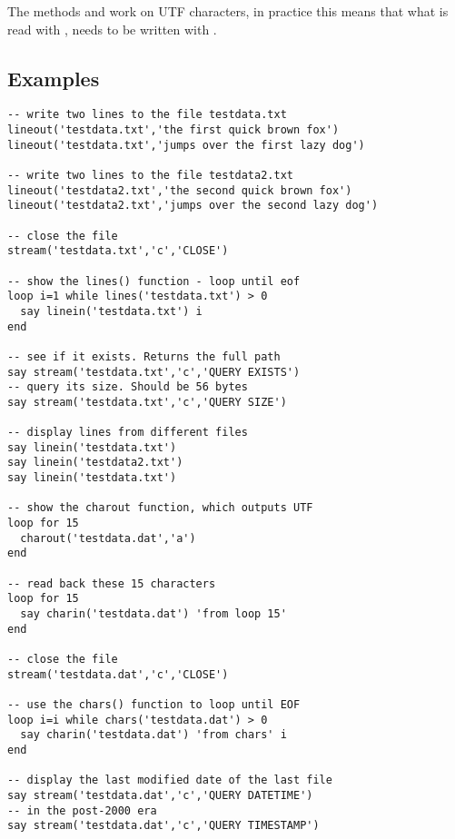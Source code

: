 The methods  and  work on UTF
characters, in practice this means that what is read with
, needs to be written with .


\subsection{Examples}
\begin{lstlisting}[label=datessexample,caption=Example of using Date()]
-- write two lines to the file testdata.txt
lineout('testdata.txt','the first quick brown fox')
lineout('testdata.txt','jumps over the first lazy dog')

-- write two lines to the file testdata2.txt
lineout('testdata2.txt','the second quick brown fox')
lineout('testdata2.txt','jumps over the second lazy dog')

-- close the file
stream('testdata.txt','c','CLOSE')

-- show the lines() function - loop until eof
loop i=1 while lines('testdata.txt') > 0
  say linein('testdata.txt') i
end

-- see if it exists. Returns the full path
say stream('testdata.txt','c','QUERY EXISTS')
-- query its size. Should be 56 bytes
say stream('testdata.txt','c','QUERY SIZE')

-- display lines from different files 
say linein('testdata.txt')
say linein('testdata2.txt')
say linein('testdata.txt')

-- show the charout function, which outputs UTF
loop for 15
  charout('testdata.dat','a')
end

-- read back these 15 characters
loop for 15
  say charin('testdata.dat') 'from loop 15'
end

-- close the file
stream('testdata.dat','c','CLOSE')

-- use the chars() function to loop until EOF
loop i=i while chars('testdata.dat') > 0
  say charin('testdata.dat') 'from chars' i
end

-- display the last modified date of the last file
say stream('testdata.dat','c','QUERY DATETIME')
-- in the post-2000 era
say stream('testdata.dat','c','QUERY TIMESTAMP')

\end{lstlisting}
